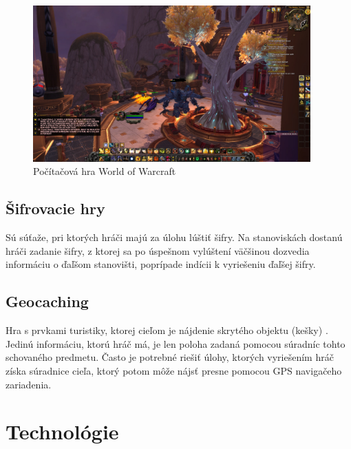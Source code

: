 \begin{figure}[h]
  \centering
  \includegraphics[height=6cm]{mainmatter/imgs/wow.jpg}
  \caption{Počítačová hra World of Warcraft}
  \label{fig:comenius}
\end{figure}


\subsection{Šifrovacie hry}
Sú súťaže, pri ktorých hráči majú za úlohu lúštiť šifry. Na stanoviskách dostanú hráči zadanie šifry, z ktorej sa po úspešnom vylúštení väčšinou dozvedia informáciu o ďaľšom stanovišti, poprípade indícii k vyriešeniu ďaľšej šifry. 

\subsection{Geocaching} 
Hra s prvkami turistiky, ktorej cieľom je nájdenie skrytého objektu (kešky) \cite{geocaching}. Jedinú informáciu, ktorú hráč má, je len poloha zadaná pomocou súradníc tohto schovaného predmetu. Často je potrebné riešiť úlohy, ktorých vyriešením hráč získa súradnice cieľa, ktorý potom môže nájsť presne pomocou GPS navigačeho zariadenia.

\section{Technológie}


